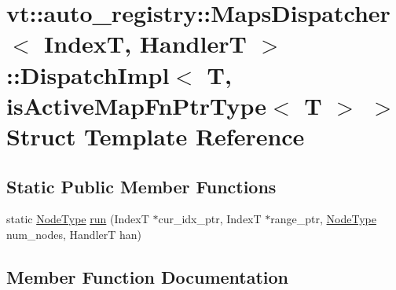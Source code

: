 \hypertarget{structvt_1_1auto__registry_1_1_maps_dispatcher_1_1_dispatch_impl_3_01_t_00_01is_active_map_fn_ptr_type_3_01_t_01_4_01_4}{}\section{vt\+:\+:auto\+\_\+registry\+:\+:Maps\+Dispatcher$<$ IndexT, HandlerT $>$\+:\+:Dispatch\+Impl$<$ T, is\+Active\+Map\+Fn\+Ptr\+Type$<$ T $>$ $>$ Struct Template Reference}
\label{structvt_1_1auto__registry_1_1_maps_dispatcher_1_1_dispatch_impl_3_01_t_00_01is_active_map_fn_ptr_type_3_01_t_01_4_01_4}
\subsection*{Static Public Member Functions}
\begin{DoxyCompactItemize}
\item 
static \hyperlink{namespacevt_a866da9d0efc19c0a1ce79e9e492f47e2}{Node\+Type} \hyperlink{structvt_1_1auto__registry_1_1_maps_dispatcher_1_1_dispatch_impl_3_01_t_00_01is_active_map_fn_ptr_type_3_01_t_01_4_01_4_a9d789b6efe093cf2b142916f6b62a63d}{run} (IndexT $\ast$cur\+\_\+idx\+\_\+ptr, IndexT $\ast$range\+\_\+ptr, \hyperlink{namespacevt_a866da9d0efc19c0a1ce79e9e492f47e2}{Node\+Type} num\+\_\+nodes, HandlerT han)
\end{DoxyCompactItemize}


\subsection{Member Function Documentation}
\mbox{\label{structvt_1_1auto__registry_1_1_maps_dispatcher_1_1_dispatch_impl_3_01_t_00_01is_active_map_fn_ptr_type_3_01_t_01_4_01_4_a9d789b6efe093cf2b142916f6b62a63d}} 
